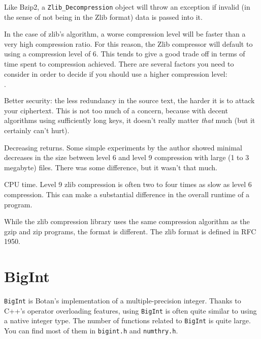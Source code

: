 \documentclass{article}
\newcommand{\filename}[1]{\texttt{#1}}
\newcommand{\type}[1]{\texttt{#1}}
\begin{document}
Like Bzip2, a \type{Zlib\_Decompression} object will throw an exception if
invalid (in the sense of not being in the Zlib format) data is passed into it.

In the case of zlib's algorithm, a worse compression level will be faster than
a very high compression ratio. For this reason, the Zlib compressor will
default to using a compression level of 6. This tends to give a good trade off
in terms of time spent to compression achieved. There are several factors you
need to consider in order to decide if you should use a higher compression
level:

\begin{list}{$\cdot$}
  \item Better security: the less redundancy in the source text, the harder it
        is to attack your ciphertext. This is not too much of a concern,
        because with decent algorithms using sufficiently long keys, it doesn't
        really matter \emph{that} much (but it certainly can't hurt).
  \item

  \item Decreasing returns. Some simple experiments by the author showed
        minimal decreases in the size between level 6 and level 9 compression
        with large (1 to 3 megabyte) files. There was some difference, but it
        wasn't that much.

  \item CPU time. Level 9 zlib compression is often two to four times as slow
        as level 6 compression. This can make a substantial difference in the
        overall runtime of a program.
\end{list}

While the zlib compression library uses the same compression algorithm as the
gzip and zip programs, the format is different. The zlib format is defined in
RFC 1950.

\pagebreak

\section{BigInt}

\type{BigInt} is Botan's implementation of a multiple-precision
integer. Thanks to C++'s operator overloading features, using \type{BigInt} is
often quite similar to using a native integer type. The number of functions
related to \type{BigInt} is quite large. You can find most of them in
\filename{bigint.h} and \filename{numthry.h}.
\end{document}
